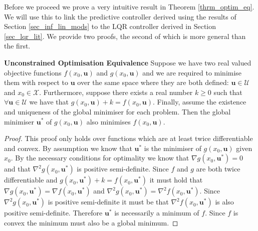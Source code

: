 Before we proceed we prove a very intuitive result in Theorem \ref{thrm_optim_eq}. We will use this to link the predictive controller derived using the results of Section \ref{sec_inf_lin_mods} to the LQR controller derived in Section \ref{sec_lqr_lit}. We provide two proofs, the second of which is more general than the first.
\begin{thrm}
\textbf{Unconstrained Optimisation Equivalence} Suppose we have two real valued objective functions $f(x_0,\mathbf{u})$ and $g(x_0, \mathbf{u})$ and we are required to minimise them with respect to $\mathbf{u}$ over the same space where they are both defined: $\mathbf{u}\in \mathcal{U}$ and $x_0 \in \mathcal{X}$. Furthermore, suppose there exists a real number $k \geq 0$ such that $\forall \mathbf{u} \in \mathcal{U}$ we have that $g(x_0, \mathbf{u}) + k = f(x_0, \mathbf{u})$. Finally, assume the existence and uniqueness of the global minimiser for each problem. Then the global minimiser $\mathbf{u}^*$ of $g(x_0, \mathbf{u})$ also minimises $f(x_0, \mathbf{u})$.
\label{thrm_optim_eq}
\end{thrm}
\begin{proof}
This proof only holds over functions which are at least twice differentiable and convex. By assumption we know that $\mathbf{u}^*$ is the minimiser of $g(x_0, \mathbf{u})$ given $x_0$. By the necessary conditions for optimality \cite{forst} we know that $\nabla g(x_0, \mathbf{u}^*) = 0$ and that $\nabla ^2 g(x_0, \mathbf{u}^*)$ is positive semi-definite. Since $f$ and $g$ are both twice differentiable and  $g(x_0, \mathbf{u}^*) + k = f(x_0, \mathbf{u}^*)$ it must hold that $\nabla g(x_0, \mathbf{u}^*) = \nabla f(x_0, \mathbf{u}^*)$ and  $\nabla ^2 g(x_0, \mathbf{u}^*) = \nabla ^2 f(x_0, \mathbf{u}^*)$. Since $\nabla ^2 g(x_0, \mathbf{u}^*)$ is positive semi-definite it must be that $\nabla ^2 f(x_0, \mathbf{u}^*)$ is also positive semi-definite. Therefore $\mathbf{u}^*$ is necessarily a minimum of $f$. Since $f$ is convex the minimum must also be a global minimum.
\end{proof}
